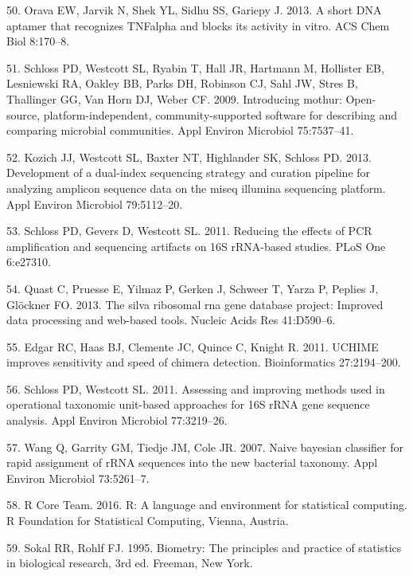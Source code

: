 \documentclass[11pt,]{article}
\begin{document}
\hypertarget{ref-orava_short_2013}{}
50. Orava EW, Jarvik N, Shek YL, Sidhu SS, Gariepy J. 2013. A short DNA
aptamer that recognizes TNFalpha and blocks its activity in vitro. ACS
Chem Biol 8:170--8.

\hypertarget{ref-schloss_mothur_2009}{}
51. Schloss PD, Westcott SL, Ryabin T, Hall JR, Hartmann M, Hollister
EB, Lesniewski RA, Oakley BB, Parks DH, Robinson CJ, Sahl JW, Stres B,
Thallinger GG, Van Horn DJ, Weber CF. 2009. Introducing mothur:
Open-source, platform-independent, community-supported software for
describing and comparing microbial communities. Appl Environ Microbiol
75:7537--41.

\hypertarget{ref-Kozich_MiSeqSOP_2013}{}
52. Kozich JJ, Westcott SL, Baxter NT, Highlander SK, Schloss PD. 2013.
Development of a dual-index sequencing strategy and curation pipeline
for analyzing amplicon sequence data on the miseq illumina sequencing
platform. Appl Environ Microbiol 79:5112--20.

\hypertarget{ref-schloss_PCRartifacts_2011}{}
53. Schloss PD, Gevers D, Westcott SL. 2011. Reducing the effects of PCR
amplification and sequencing artifacts on 16S rRNA-based studies. PLoS
One 6:e27310.

\hypertarget{ref-Quast_silva_2013}{}
54. Quast C, Pruesse E, Yilmaz P, Gerken J, Schweer T, Yarza P, Peplies
J, Glöckner FO. 2013. The silva ribosomal rna gene database project:
Improved data processing and web-based tools. Nucleic Acids Res
41:D590--6.

\hypertarget{ref-edgar_uchime_2011}{}
55. Edgar RC, Haas BJ, Clemente JC, Quince C, Knight R. 2011. UCHIME
improves sensitivity and speed of chimera detection. Bioinformatics
27:2194--200.

\hypertarget{ref-schloss_OTUanalysis_2011}{}
56. Schloss PD, Westcott SL. 2011. Assessing and improving methods used
in operational taxonomic unit-based approaches for 16S rRNA gene
sequence analysis. Appl Environ Microbiol 77:3219--26.

\hypertarget{ref-wang_taxonomy_2007}{}
57. Wang Q, Garrity GM, Tiedje JM, Cole JR. 2007. Naive bayesian
classifier for rapid assignment of rRNA sequences into the new bacterial
taxonomy. Appl Environ Microbiol 73:5261--7.

\hypertarget{ref-R}{}
58. R Core Team. 2016. R: A language and environment for statistical
computing. R Foundation for Statistical Computing, Vienna, Austria.

\hypertarget{ref-sokal_biometrystats_1995}{}
59. Sokal RR, Rohlf FJ. 1995. Biometry: The principles and practice of
statistics in biological research, 3rd ed. Freeman, New York.
\end{document}

